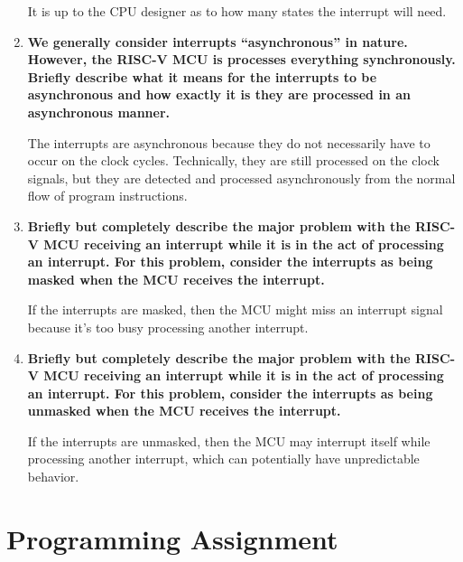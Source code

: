 \documentclass{article}
\begin{document}
\begin{enumerate}
    It is up to the CPU designer as to how many states the interrupt will need.
    
    \item \textbf{We generally consider interrupts “asynchronous” in nature. However, the RISC-V MCU is processes everything synchronously. Briefly describe what it means for the interrupts to be asynchronous and how exactly it is they are processed in an asynchronous manner.}

    The interrupts are asynchronous because they do not necessarily have to occur on the clock cycles. Technically, they are still processed on the clock signals, but they are detected and processed asynchronously from the normal flow of program instructions. 
    
    \item \textbf{Briefly but completely describe the major problem with the RISC-V MCU receiving an interrupt while it is in the act of processing an interrupt. For this problem, consider the interrupts as being masked when the MCU receives the interrupt.}

    If the interrupts are masked, then the MCU might miss an interrupt signal because it's too busy processing another interrupt. 
    
    \item \textbf{Briefly but completely describe the major problem with the RISC-V MCU receiving an interrupt while it is in the act of processing an interrupt. For this problem, consider the interrupts as being unmasked when the MCU receives the interrupt.}
    
    If the interrupts are unmasked, then the MCU may interrupt itself while processing another interrupt, which can potentially have unpredictable behavior.

    
\end{enumerate}

\pagebreak
\section{Programming Assignment}
\end{document}
